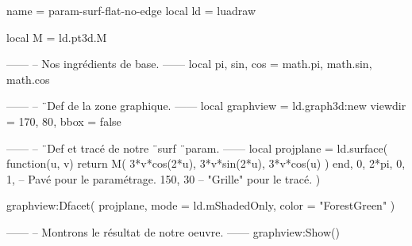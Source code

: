 \documentclass[border = 3pt]{standalone}
\begin{document}
\begin{luadraw*}{name = param-surf-flat-no-edge}
local ld = luadraw

local M = ld.pt3d.M

------
-- Nos ingrédients de base.
------
local pi, sin, cos = math.pi, math.sin, math.cos

------
-- ¨Def de la zone graphique.
------
local graphview = ld.graph3d:new{
  viewdir = {170, 80},
  bbox    = false
}

------
-- ¨Def et tracé de notre ¨surf ¨param.
------
local projplane = ld.surface(
  function(u, v)
    return M(
      3*v*cos(2*u),
      3*v*sin(2*u),
      3*v*cos(u)
    )
  end,
  0, 2*pi, 0, 1,  -- Pavé pour le paramétrage.
  {150, 30}       -- "Grille" pour le tracé.
)

graphview:Dfacet(
  projplane,
  {
    mode  = ld.mShadedOnly,
    color = "ForestGreen"
  }
)

------
-- Montrons le résultat de notre oeuvre.
------
graphview:Show()
\end{luadraw*}
\end{document}

